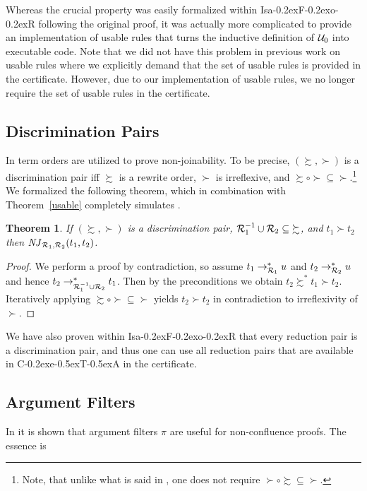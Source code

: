 \documentclass[a4paper]{easychair}
\newtheorem{theorem}{Theorem}
\newcommand\isafor{\textsf{Isa\kern-0.2exF\kern-0.2exo\kern-0.2exR}\xspace}
\newcommand\ceta{\textsf{C\kern-0.2exe\kern-0.5exT\kern-0.5exA}\xspace}
\newcommand\RR{{\cal R}}
\newcommand\Uz{{\cal U}_0}
\newcommand\njin[3]{\mathit{NJ}_{#1}(#2,#3)}
\newcommand\nj[4]{\njin{#1,#2}{#3}{#4}}
\newcommand\rTH[1]{Theorem~\ref{#1}}
\begin{document}
Whereas the crucial property was easily formalized within \isafor following the 
original proof, it was actually more complicated to provide an implementation of usable rules
that turns the inductive definition of $\Uz$ into executable code. 
Note that we did not have this problem in previous work on
usable rules \cite{CSRT-RTA10} where we explicitly demand that the set of usable rules is provided in the certificate. However, due to our implementation of usable rules, we no longer require the
set of usable rules in the certificate.

\subsection{Discrimination Pairs}
In \cite{Aoto} term orders are utilized to prove non-joinability.
To be precise, $(\succsim,\succ)$ is a discrimination pair iff $\succsim$ is a rewrite order,
$\succ$ is irreflexive, and ${\succsim} \circ {\succ} \subseteq {\succ}$.\footnote{Note, that
unlike what is said in \cite{Aoto}, one 
does not require ${\succ} \circ {\succsim} \subseteq {\succ}$.}
We formalized the following theorem, which in combination with \rTH{usable}
completely simulates \cite[Theorem 12]{Aoto}.
\begin{theorem}

\label{discrimination pairs}
If $(\succsim,\succ)$ is a discrimination pair, ${\RR_1^{-1} \cup \RR_2} \subseteq {\succsim}$, 
and $t_1 \succ t_2$ then $\nj{\RR_1}{\RR_2}{t_1}{t_2}$.
\end{theorem}

\begin{proof}
We perform a proof by contradiction, so 
assume $t_1 \to_{\RR_1}^* u$ and $t_2 \to_{\RR_2}^* u$ and hence $t_2 \to_{\RR_1^{-1} \cup \RR_2}^* t_1$.
Then by the preconditions
we obtain $t_2 \succsim^* t_1 \succ t_2$.
Iteratively applying ${\succsim} \circ {\succ} \subseteq {\succ}$ yields $t_2 \succ t_2$ 
in contradiction to irreflexivity of $\succ$.
\end{proof}

We have also proven within \isafor that every reduction pair is a discrimination pair, and
thus one can use all reduction pairs that are available in \ceta in the certificate.

\subsection{Argument Filters}
In \cite{Aoto} it is shown that argument filters $\pi$ are useful for non-confluence
proofs. The essence is
\end{document}
